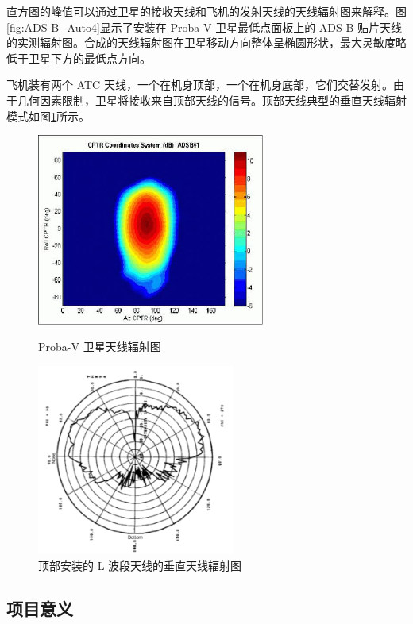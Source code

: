 直方图的峰值可以通过卫星的接收天线和飞机的发射天线的天线辐射图来解释。图\ref{fig:ADS-B_Auto4}显示了安装在 Proba-V 卫星最低点面板上的 ADS-B 贴片天线的实测辐射图。合成的天线辐射图在卫星移动方向整体呈椭圆形状，最大灵敏度略低于卫星下方的最低点方向。

飞机装有两个 ATC 天线，一个在机身顶部，一个在机身底部，它们交替发射。由于几何因素限制，卫星将接收来自顶部天线的信号。顶部天线典型的垂直天线辐射模式如图\ref{fig:antenna_of_plane}所示。

\begin{figure}[htbp]
\centering
\begin{minipage}[t]{0.48\textwidth}
\centering
\includegraphics[width=7.5cm]{pic/ADS-B_Auto4.jpeg}
\caption{Proba-V 卫星天线辐射图}
\label{fig:ADS-B_Auto4}
\end{minipage}
\begin{minipage}[t]{0.48\textwidth}
\centering
\includegraphics[width=6.5cm]{pic/antenna_of_plane.png}
\caption{顶部安装的 L 波段天线的垂直天线辐射图}
\label{fig:antenna_of_plane}
\end{minipage}
\end{figure}

\subsection{项目意义}

